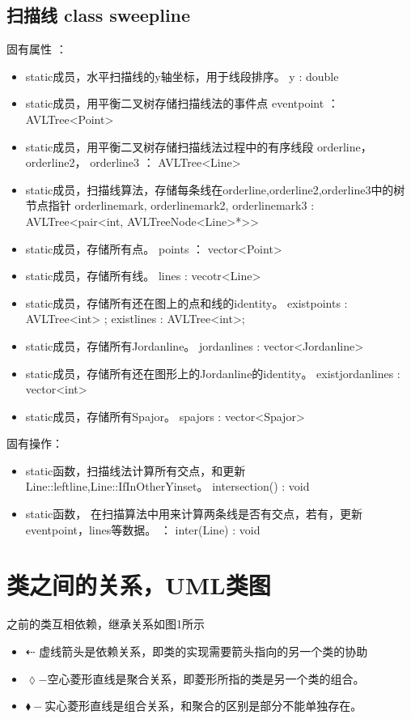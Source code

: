 \documentclass[a4paper]{book}
\numberwithin{equation}{chapter}
\theoremstyle{definition}
\begin{document}
\subsection{扫描线  class sweepline}
固有属性 ：
\begin{itemize}
	\item  static成员，水平扫描线的y轴坐标，用于线段排序。  y : double
	\item  static成员，用平衡二叉树存储扫描线法的事件点  eventpoint ： AVLTree<Point>
	\item  static成员，用平衡二叉树存储扫描线法过程中的有序线段  orderline， orderline2， orderline3  ： AVLTree<Line>
	\item  static成员，扫描线算法，存储每条线在orderline,orderline2,orderline3中的树节点指针  
	orderlinemark, orderlinemark2, orderlinemark3 : AVLTree<pair<int, AVLTreeNode<Line>*>> 
	\item  static成员，存储所有点。 points ： vector<Point>
	\item  static成员，存储所有线。 lines : vecotr<Line>
	\item  static成员，存储所有还在图上的点和线的identity。 existpoints : AVLTree<int> ; existlines : AVLTree<int>;
	\item  static成员，存储所有Jordanline。 jordanlines : vector<Jordanline>
	\item  static成员，存储所有还在图形上的Jordanline的identity。 existjordanlines : vector<int>
	\item  static成员，存储所有Spajor。  spajors : vector<Spajor>
\end{itemize}
固有操作：
\begin{itemize}
	\item  static函数，扫描线法计算所有交点，和更新Line::leftline,Line::IfInOtherYinset。
	intersection() : void
	\item  static函数， 在扫描算法中用来计算两条线是否有交点，若有，更新eventpoint，lines等数据。 ： inter(Line) : void
\end{itemize}
%

\section{\heiti  类之间的关系，UML类图}
之前的类互相依赖，继承关系如图1所示
\begin{itemize}
	\item  \begin{math}
		\dashleftarrow
	\end{math} 虚线箭头是依赖关系，即类的实现需要箭头指向的另一个类的协助
	\item  \begin{math}
		\lozenge-
	\end{math}空心菱形直线是聚合关系，即菱形所指的类是另一个类的组合。
	\item  \begin{math}
		\blacklozenge-
	\end{math}实心菱形直线是组合关系，和聚合的区别是部分不能单独存在。
\end{itemize}
\end{document}
